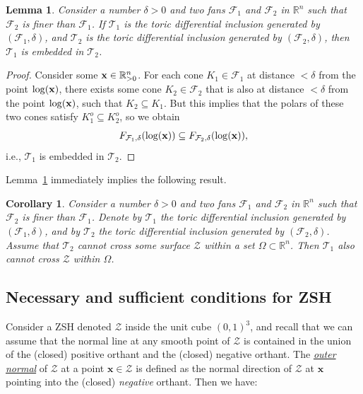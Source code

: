 \documentclass[12pt,letterpaper]{article}
\newtheorem{cor}[thm]{Corollary}
\newtheorem{lem}[thm]{Lemma}
\newcommand{\T}{\mathcal{T}}
\newcommand{\F}{\mathcal{F}}
\newcommand{\Z}{\mathcal{Z}}
\newcommand{\x}{\mathbf{x}}
\newcommand{\RR}{\mathbb{R}}
\begin{document}
\begin{lem}
\label{lemma_1}
%
Consider a number $\delta >0$ and two  fans $\F_1$ and $\F_2$ in $\RR^n$ such that $\F_2$ is finer than $\F_1$. If $\T_1$ is the toric differential inclusion generated by $(\F_1, \delta)$, and $\T_2$ is the toric differential inclusion generated by $(\F_2, \delta)$, then $\T_1$ is embedded in $\T_2$.
%
\end{lem}

\begin{proof}
Consider some ${\bf x} \in \RR^n_{>0}$. For each cone $K_1\in\F_1$ at distance $<\delta$ from the point $\log({\bf x})$, there exists some cone $K_2\in\F_2$ that is also at distance $<\delta$ from the point $\log({\bf x})$, such that $K_2 \subseteq K_1$. But this implies that the polars of these two cones satisfy $K_1^o \subseteq K_2^o$, so we obtain
$$
F_{\F_1,\delta} (\log({\bf x}))  \subseteq F_{\F_2,\delta} (\log({\bf x})),
$$
i.e., $\T_1$ is embedded in $\T_2$.
\end{proof}

Lemma~\ref{lemma_1} immediately implies the following result.

\begin{cor}
\label{cor_1}
%
Consider a number $\delta >0$ and two  fans $\F_1$ and $\F_2$ in $\RR^n$ such that $\F_2$ is finer than $\F_1$. Denote by $\T_1$  the toric differential inclusion generated by $(\F_1, \delta)$, and by $\T_2$  the toric differential inclusion generated by $(\F_2, \delta)$. Assume that $\T_2$ cannot cross some surface $\Z$ within a set $\Omega \subset \RR^n$. Then $\T_1$ also cannot cross  $\Z$ within $\Omega$.
%
\end{cor}






\bigskip

\subsection{Necessary and sufficient conditions for ZSH}

Consider a ZSH denoted $\Z$ inside the unit cube $(0,1)^3$, and recall that we can assume that the normal line at any smooth point of $\Z$ is contained in the union of the (closed) positive orthant and the (closed) negative orthant. 
The  \ul{\em outer normal} of $\Z$ at a point $\x \in \Z$ is defined as the normal direction of $\Z$ at  $\x$ pointing into the (closed) {\em negative} orthant. Then we have:
\end{document}
